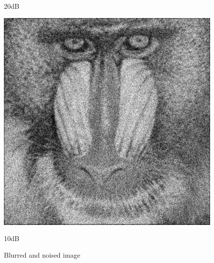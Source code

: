 \documentclass{article}
\begin{document}
\begin{figure}[H]
\begin{minipage}[b]{0.32\linewidth}
		\caption*{20dB}
	\end{minipage}
	\begin{minipage}[b]{0.32\linewidth}
		\includegraphics[width=\linewidth,bb=0 0 20cm 20cm]{bn1.bmp}
		\caption*{10dB}
	\end{minipage}
	\caption{Blurred and noised image}
	\label{noise}
\end{figure}
\end{document}
